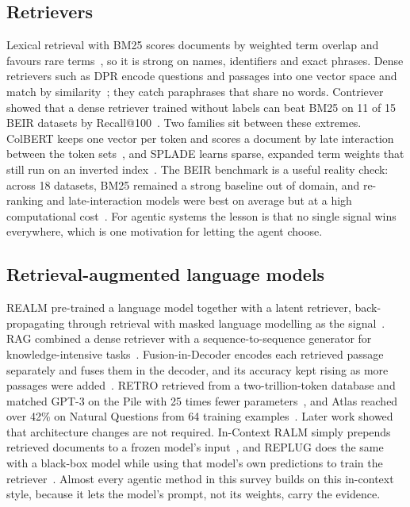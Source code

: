 \documentclass[pdflatex,sn-mathphys-num]{sn-jnl}%
\begin{document}
\subsection{Retrievers}
Lexical retrieval with BM25 scores documents by weighted term overlap and favours rare terms~\cite{robertson2009bm25}, so it is strong on names, identifiers and exact phrases. Dense retrievers such as DPR encode questions and passages into one vector space and match by similarity~\cite{karpukhin2020dpr}; they catch paraphrases that share no words. Contriever showed that a dense retriever trained without labels can beat BM25 on 11 of 15 BEIR datasets by Recall@100~\cite{izacard2022contriever}. Two families sit between these extremes. ColBERT keeps one vector per token and scores a document by late interaction between the token sets~\cite{khattab2020colbert}, and SPLADE learns sparse, expanded term weights that still run on an inverted index~\cite{formal2021splade}. The BEIR benchmark is a useful reality check: across 18 datasets, BM25 remained a strong baseline out of domain, and re-ranking and late-interaction models were best on average but at a high computational cost~\cite{thakur2021beir}. For agentic systems the lesson is that no single signal wins everywhere, which is one motivation for letting the agent choose.

\subsection{Retrieval-augmented language models}
REALM pre-trained a language model together with a latent retriever, back-propagating through retrieval with masked language modelling as the signal~\cite{guu2020realm}. RAG combined a dense retriever with a sequence-to-sequence generator for knowledge-intensive tasks~\cite{lewis2020rag}. Fusion-in-Decoder encodes each retrieved passage separately and fuses them in the decoder, and its accuracy kept rising as more passages were added~\cite{izacard2021fid}. RETRO retrieved from a two-trillion-token database and matched GPT-3 on the Pile with 25 times fewer parameters~\cite{borgeaud2022retro}, and Atlas reached over 42\% on Natural Questions from 64 training examples~\cite{izacard2023atlas}. Later work showed that architecture changes are not required. In-Context RALM simply prepends retrieved documents to a frozen model's input~\cite{ram2023incontextralm}, and REPLUG does the same with a black-box model while using that model's own predictions to train the retriever~\cite{shi2024replug}. Almost every agentic method in this survey builds on this in-context style, because it lets the model's prompt, not its weights, carry the evidence.
\end{document}
